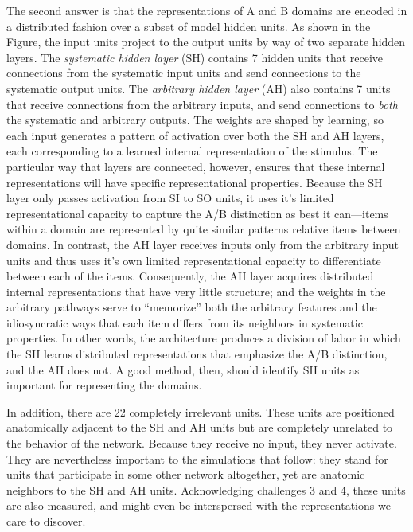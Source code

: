 The second answer is that the representations of A and B domains are encoded in a distributed fashion over a subset of model hidden units. As shown in the Figure, the input units project to the output units by way of two separate hidden layers. The {\em systematic hidden layer} (SH) contains 7 hidden units that receive connections from the systematic input units and send connections to the systematic output units. The {\em arbitrary hidden layer} (AH) also contains 7 units that receive connections from the arbitrary inputs, and send connections to {\em both} the systematic and arbitrary outputs.  The weights are shaped by learning, so each input generates a pattern of activation over both the SH and AH layers, each corresponding to a learned internal representation of the stimulus. The particular way that layers are connected, however, ensures that these internal representations will have specific representational properties. Because the SH layer only passes activation from SI to SO units, it uses it's limited representational capacity to capture the A/B distinction as best it can---items within a domain are represented by quite similar patterns relative items between domains. In contrast, the AH layer receives inputs only from the arbitrary input units and thus uses it's own limited representational capacity to differentiate between each of the items. Consequently, the AH layer acquires distributed internal representations that have very little structure; and the weights in the arbitrary pathways serve to ``memorize'' both the arbitrary features and the idiosyncratic ways that each item differs from its neighbors in systematic properties. In other words, the architecture produces a division of labor in which the SH learns distributed representations that emphasize the A/B distinction, and the AH does not. A good method, then, should identify SH units as important for representing the domains.

In addition, there are 22 completely irrelevant units. These units are positioned anatomically adjacent to the SH and AH units but are completely unrelated to the behavior of the network. Because they receive no input, they never activate. They are nevertheless important to the simulations that follow: they stand for units that participate in some other network altogether, yet are anatomic neighbors to the SH and AH units. Acknowledging challenges 3 and 4, these units are also measured, and might even be interspersed with the representations we care to discover.

